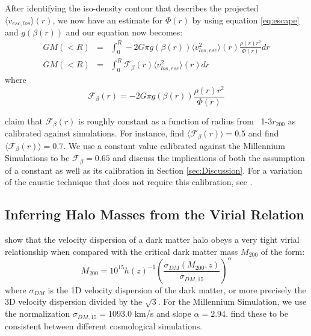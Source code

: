 \documentclass[iop]{emulateapj}
\begin{document}
       After identifying the iso-density contour that describes the projected $\langle v_{esc,los}\rangle (r)$, we now have an estimate for $\Phi(r)$ by using equation \ref{eq:escape} and $g(\beta(r))$ and our equation now becomes:
        \begin{eqnarray}
        G M(<R) &=& \int_0^R -2 G \pi g(\beta(r))\langle v_{los,esc}^2\rangle (r) \frac{\rho (r) r^2}{\Phi (r)} dr \\
        G M(<R) &=& \int_0^R \mathcal{F}_{\beta}(r) \langle v_{los,esc}^2 \rangle (r) dr
        \label{eq:caustic_final}
        \end{eqnarray}
        where
        \begin{equation}
        \mathcal{F}_{\beta}(r) = -2 G \pi g(\beta(r)) \frac{\rho (r) r^2}{\Phi (r)} 
        \end{equation}
        
        \citet{Diaferio99} claim that $\mathcal{F}_{\beta}(r)$ is roughly constant as a function of radius from ~1-3$r_{200}$ as calibrated against simulations. For instance, \citet{Diaferio99} find $\langle \mathcal{F}_{\beta}(r) \rangle = 0.5$ and \citet{Serra11} find $\langle \mathcal{F}_{\beta}(r) \rangle = 0.7$.   We use a constant value calibrated against the Millennium Simulations to be $\mathcal{F}_{\beta} = 0.65$ and discuss the implications of both the assumption of a constant as well as its calibration in Section \ref{sec:Discussion}. For a variation of the caustic technique that does not require this calibration, see \cite{Gifford13b}.

    \subsection{Inferring Halo Masses from the Virial Relation}
    \label{sec:methods_virial}
    
\citet{Evrard08} show that the velocity dispersion of a dark matter halo obeys a very tight virial relationship when compared with the critical dark matter mass $M_{200}$ of the form:
        \begin{equation}
    M_{200} = 10^{15} h(z)^{-1}\left ( \frac{\sigma_{DM}(M_{200},z)}{\sigma_{DM,15}} \right )^{\alpha}
        \label{eq:Evrard_rel}
        \end{equation}
where $\sigma_{DM}$ is the 1D velocity dispersion of the dark matter, or more precisely the 3D velocity dispersion divided by the $\sqrt{3}$.  For the Millennium Simulation, we use the normalization $\sigma_{DM,15} = 1093.0$ km/s and slope $\alpha = 2.94$. \citet{Evrard08} find these to be consistent between different cosmological simulations. 
\end{document}
